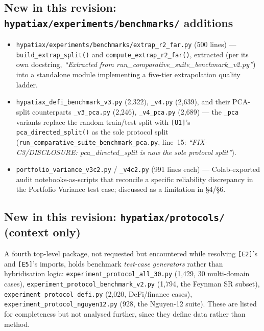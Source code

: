\documentclass[11pt,a4paper]{article}
\newcommand{\code}[1]{\texttt{\small #1}}
\begin{document}
\subsection{New in this revision: \code{hypatiax/experiments/benchmarks/} additions}
\begin{itemize}[leftmargin=1.4cm]
  \item[\code{[E5]}] \code{hypatiax/experiments/benchmarks/extrap\_r2\_far.py}
        (500 lines) --- \code{build\_extrap\_split()} and
        \code{compute\_extrap\_r2\_far()}, extracted (per its own docstring,
        \emph{``Extracted from run\_comparative\_suite\_benchmark\_v2.py''})
        into a standalone module implementing a five-tier extrapolation
        quality ladder.
  \item[\code{[E6]}] \code{hypatiax\_defi\_benchmark\_v3.py} (2{,}322),
        \code{\_v4.py} (2{,}639), and their PCA-split counterparts
        \code{\_v3\_pca.py} (2{,}246), \code{\_v4\_pca.py} (2{,}689) ---
        the \code{\_pca} variants replace the random train/test split with
        \code{[U1]}'s \code{pca\_directed\_split()} as the sole protocol
        split (\code{run\_comparative\_suite\_benchmark\_pca.py}, line~15:
        \emph{``FIX-C3/DISCLOSURE: pca\_directed\_split is now the sole
        protocol split''}).
  \item[\code{[E7]}] \code{portfolio\_variance\_v3c2.py} /
        \code{\_v4c2.py} (991 lines each) --- Colab-exported audit
        notebooks-as-scripts that reconcile a specific reliability
        discrepancy in the Portfolio Variance test case; discussed as a
        limitation in \S4/\S6.
\end{itemize}

\subsection{New in this revision: \code{hypatiax/protocols/} (context only)}
A fourth top-level package, not requested but encountered while resolving
\code{[E2]}'s and \code{[E5]}'s imports, holds benchmark \emph{test-case
generators} rather than hybridisation logic:
\code{experiment\_protocol\_all\_30.py} (1{,}429, 30 multi-domain cases),
\code{experiment\_protocol\_benchmark\_v2.py} (1{,}794, the Feynman SR
subset), \code{experiment\_protocol\_defi.py} (2{,}020, DeFi/finance
cases), \code{experiment\_protocol\_nguyen12.py} (928, the Nguyen-12
suite). These are listed for completeness but not analysed further, since
they define data rather than method.
\end{document}
